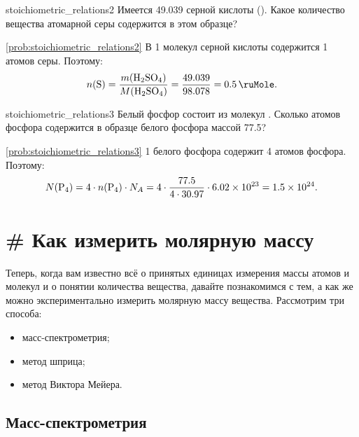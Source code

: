 \begin{problem}{}{stoichiometric_relations2}
    Имеется \qty{49,039}{\ruG} серной кислоты (). Какое количество вещества атомарной серы содержится в этом образце?
    \begin{sol}{\ref{prob:stoichiometric_relations2}}
        В \qty{1}{\ruMole} молекул серной кислоты содержится \qty{1}{\ruMole} атомов серы. Поэтому:
        \begin{equation*}
            n(\ce{S}) = \frac{m(\ce{H2SO4})}{M(\ce{H2SO4})} = \frac{\num{49,039}}{\num{98,078}} = \qty{0,5}{\ruMole}.
        \end{equation*}
    \end{sol}
\end{problem}

\begin{problem}{}{stoichiometric_relations3}
    Белый фосфор состоит из молекул . Сколько атомов фосфора содержится в образце белого фосфора массой \qty{77,5}{\ruG}?
    \begin{sol}{\ref{prob:stoichiometric_relations3}}
        \qty{1}{\ruMole} белого фосфора содержит \qty{4}{\ruMole} атомов фосфора. Поэтому:
        \begin{equation*}
            N(\ce{P4}) = 4 \cdot n(\ce{P4}) \cdot N_A = 4 \cdot \frac{\num{77,5}}{4 \cdot \num{30,97}} \cdot \num{6,02e23} = \num{1,5e24}.
        \end{equation*}
    \end{sol}
\end{problem}

\clearpage

\section{\# Как измерить молярную массу}

Теперь, когда вам известно всё о принятых единицах измерения массы атомов и молекул и о понятии количества вещества, давайте познакомимся с тем, а как же можно экспериментально измерить молярную массу вещества. Рассмотрим три способа:

\begin{itemize}
    \item масс-спектрометрия;
    \item метод шприца;
    \item метод Виктора Мейера.
\end{itemize}

\subsection*{Масс-спектрометрия}

